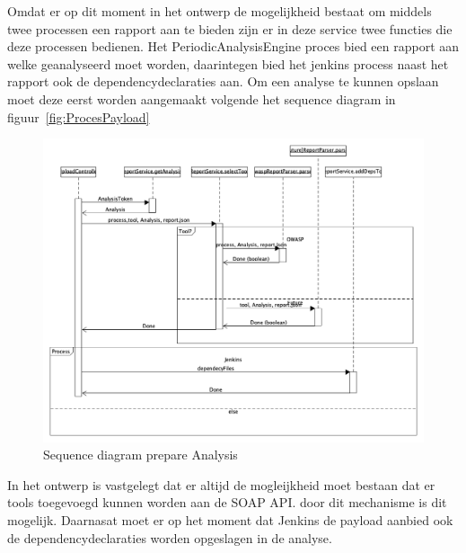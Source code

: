 Omdat er op dit moment in het ontwerp de mogelijkheid bestaat om middels twee processen een rapport aan te bieden zijn er in deze service twee functies die deze processen bedienen.
Het PeriodicAnalysisEngine proces bied een rapport aan welke geanalyseerd moet worden, daarintegen bied het jenkins process naast het rapport ook de dependencydeclaraties aan. Om een analyse te kunnen opslaan moet deze eerst worden aangemaakt volgende het sequence diagram in figuur~\ref{fig:ProcesPayload}
\begin{figure}[bth]
    \myfloatalign
    \includegraphics[width=14cm]{gfx/umlet/exports/SeqProcessPayload}
    \caption{Sequence diagram prepare Analysis}
    \label{fig:analysisPrepare}
\end{figure}

In het ontwerp is vastgelegt dat er altijd de mogleijkheid moet bestaan dat er tools toegevoegd kunnen worden aan de SOAP API. door dit mechanisme is dit mogelijk. Daarnasat moet er op het moment dat Jenkins de payload aanbied ook de dependencydeclaraties worden opgeslagen in de analyse.

